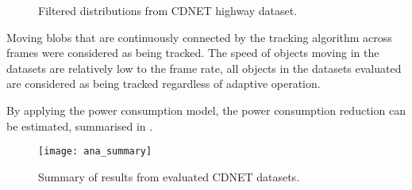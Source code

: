 \begin{figure}[htb]
  \centering
  \caption{Filtered distributions from CDNET highway dataset.}
  \label{ana:ada}
\end{figure}

Moving blobs that are continuously connected by the tracking algorithm across frames were considered as being tracked. The speed of objects moving in the datasets are relatively low to the frame rate, all objects in the datasets evaluated are considered as being tracked regardless of adaptive operation.

By applying the power consumption model, the power consumption reduction can be estimated, summarised in .

\begin{figure}[htb]
  \centering
  \texttt{[image: ana\_summary]}
  \caption{Summary of results from evaluated CDNET datasets.}
  \label{ana:summary}
\end{figure}
